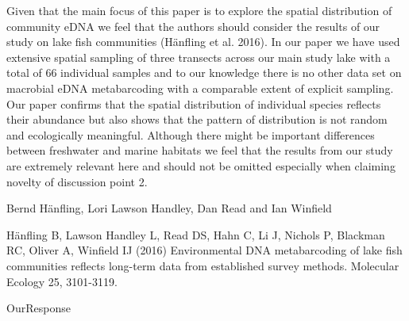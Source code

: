 \documentclass{article}
\newenvironment{response}
	{
	\begin{adjustwidth}{1cm}{0cm}
	\itshape %
	}
	{
	\end{adjustwidth}
	}
\begin{document}
Given that the main focus of this paper is to explore the spatial distribution of community eDNA we feel that the authors should consider the results of our study on lake fish communities (Hänfling et al. 2016). In our paper we have used extensive spatial sampling of three transects across our main study lake with a total of 66 individual samples and to our knowledge there is no other data set on macrobial eDNA metabarcoding with a comparable extent of explicit sampling. Our paper confirms that the spatial distribution of individual species reflects their abundance but also shows that the pattern of distribution is not random and ecologically meaningful. Although there might be important differences between freshwater and marine habitats we feel that the results from our study are extremely relevant here and should not be omitted especially when claiming novelty of discussion point 2.

Bernd Hänfling, Lori Lawson Handley, Dan Read and Ian Winfield

Hänfling B, Lawson Handley L, Read DS, Hahn C, Li J, Nichols P, Blackman RC, Oliver A, Winfield IJ (2016) Environmental DNA metabarcoding of lake fish communities reflects long-term data from established survey methods. Molecular Ecology 25, 3101-3119.
\begin{response}
  OurResponse\\
\end{response}
\end{document}
